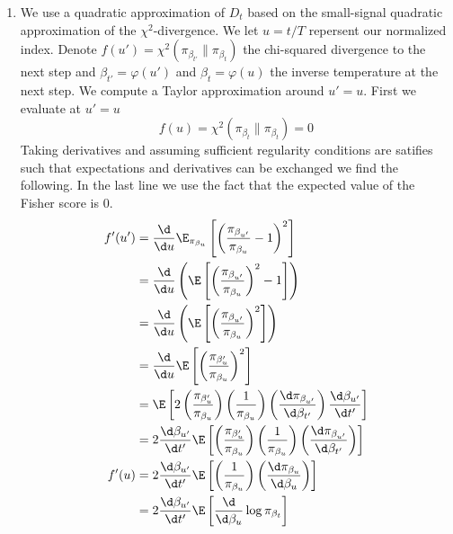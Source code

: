 \documentclass{article}
\begin{document}
\begin{enumerate}
    \item %
    We use a quadratic approximation of $D_t$ based on the small-signal
    quadratic approximation of the $\chi^2$-divergence. We let $u = t/T$
    repersent our normalized index. Denote
    $f(u') = \chi^2(\pi_{\beta_{t'}} \| \pi_{\beta_t})$ the chi-squared divergence
    to the next step and 
    $\beta_{t'} = \varphi(u')$ and $\beta_t = \varphi(u)$ the inverse temperature
    at the next step.
    We compute a Taylor
    approximation around $u'= u$. First we evaluate at $u' = u$
    \[
        f(u) = \chi^2(\pi_{\beta_t} \| \pi_{\beta_t}) = 0
    \]
    Taking derivatives and assuming sufficient regularity conditions are
    satifies such that expectations and derivatives can be exchanged we find the
    following. In the last line we use the fact that the expected value of the
    Fisher score is 0.
    \begin{align}
        f'(u') &= \frac{\d}{\d u} \E_{\pi_{\beta_u}} \left[ \left(
            \frac{\pi_{\beta_{u'}}}{\pi_{\beta_{u}}} - 1
            \right)^2 \right] \\
        &= \frac{\d}{\d u}\left( \E \left[ \left(
            \frac{\pi_{\beta_{u'}}}{\pi_{\beta_{u}}}
            \right)^2  - 1\right]\right) \\
        &= \frac{\d}{\d u}\left( \E \left[ \left(
            \frac{\pi_{\beta_{u'}}}{\pi_{\beta_{u}}}
            \right)^2 \right] \right) \\ 
        &=   \frac{\d}{\d u}\E \left[ \left(
            \frac{\pi_{\beta_u'}}{\pi_{\beta_{u}}}
            \right)^2 \right] \\
        &= \E\left[2\left(
            \frac{\pi_{\beta_u'}}{\pi_{\beta_{u}}}
            \right)\left(\frac 1 {\pi_{\beta_u}}\right)
            \left(\frac{\d \pi_{\beta_{u'}}}{\d \beta_{t'}}\right)
            \frac{\d \beta_{u'}}{\d t'}\right] \\
        &= 2\frac{\d \beta_{u'}}{\d t'}
            \E\left[
                \left(
            \frac{\pi_{\beta_u'}}{\pi_{\beta_{u}}}
            \right)\left(\frac 1 {\pi_{\beta_u}}\right)
            \left(\frac{\d \pi_{\beta_{u'}}}{\d \beta_{t'}}\right)
            \right] \\
        f'(u) &= 
            2\frac{\d \beta_{u'}}{\d t'}
            \E\left[
            \left(\frac 1 {\pi_{\beta_u}}\right)
            \left(\frac{\d \pi_{\beta_u}}{\d \beta_u}\right)
            \right]  \\
            &= 2\frac{\d \beta_{u'}}{\d t'}\E\left[\frac{\d}{\d\beta_u}\log \pi_{\beta_t}\right] \\

\end{align}
\end{enumerate}
\end{document}
